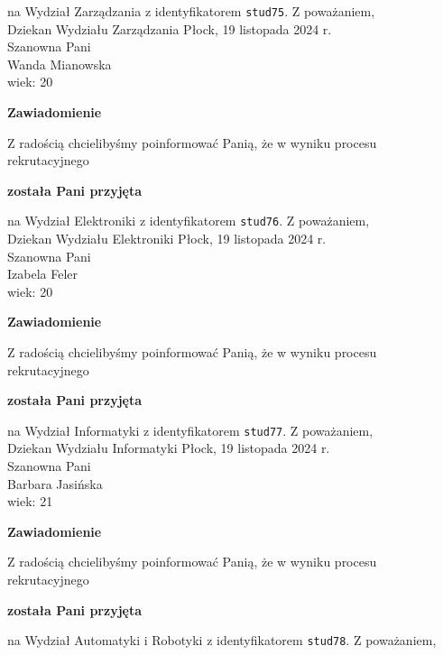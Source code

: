 \documentclass[12pt,a4paper]{article}
\begin{document}
na Wydział Zarządzania z identyfikatorem \verb|stud75|. 
\vspace{2cm}
\noindent
Z poważaniem, \\
Dziekan
Wydziału Zarządzania
\newpage
\hfill Płock, 19 listopada 2024 r. \\
\noindent
Szanowna Pani \\
Wanda Mianowska \\
wiek: 20
\bigskip
\begin{center}
    {\Large\textbf{Zawiadomienie}}
\end{center}
\bigskip 
Z radością chcielibyśmy poinformować Panią, że w wyniku procesu rekrutacyjnego
\begin{center}
\textsf{\textbf{została Pani przyjęta}}
\end{center}
na Wydział Elektroniki z identyfikatorem \verb|stud76|. 
\vspace{2cm}
\noindent
Z poważaniem, \\
Dziekan
Wydziału Elektroniki
\newpage
\hfill Płock, 19 listopada 2024 r. \\
\noindent
Szanowna Pani \\
Izabela Feler \\
wiek: 20
\bigskip
\begin{center}
    {\Large\textbf{Zawiadomienie}}
\end{center}
\bigskip 
Z radością chcielibyśmy poinformować Panią, że w wyniku procesu rekrutacyjnego
\begin{center}
\textsf{\textbf{została Pani przyjęta}}
\end{center}
na Wydział Informatyki z identyfikatorem \verb|stud77|. 
\vspace{2cm}
\noindent
Z poważaniem, \\
Dziekan
Wydziału Informatyki
\newpage
\hfill Płock, 19 listopada 2024 r. \\
\noindent
Szanowna Pani \\
Barbara Jasińska \\
wiek: 21
\bigskip
\begin{center}
    {\Large\textbf{Zawiadomienie}}
\end{center}
\bigskip 
Z radością chcielibyśmy poinformować Panią, że w wyniku procesu rekrutacyjnego
\begin{center}
\textsf{\textbf{została Pani przyjęta}}
\end{center}
na Wydział Automatyki i Robotyki z identyfikatorem \verb|stud78|. 
\vspace{2cm}
\noindent
Z poważaniem, \\
\end{document}
